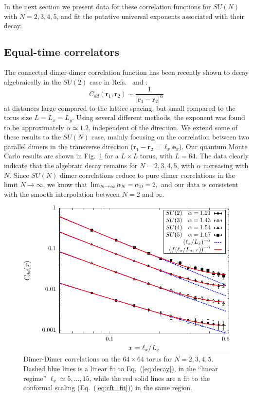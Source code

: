 \documentclass[11pt]{iopart}
\begin{document}
In the next section we present data for these correlation functions for $SU(N)$ with $N=2,3,4,5$,  and fit the putative universal exponents associated with their decay.

\subsection{Equal-time correlators}
\label{sec:dimerdimer}


The connected dimer-dimer correlation function has been recently shown to decay algebraically in the $SU(2)$ case in Refs.~\cite{RVB1} and \cite{RVB2}:
\begin{equation}\label{eq:decay}
 C_{dd}(\mathbf{r}_1,\mathbf{r}_2)\sim \frac{1}{\left|\mathbf{r}_1-\mathbf{r}_2\right|^\alpha}
\end{equation}
at distances large compared to the lattice spacing, but small compared to the torus size $L=L_x=L_y$. Using several different methods, the exponent was found to be approximately $\alpha \simeq 1.2$, independent of the direction.
We extend some of these results to the $SU(N)$ case, mainly focusing on the correlation between two parallel dimers in the transverse direction ($\mathbf{r}_1-\mathbf{r}_2=\ell_x \mathbf{e}_x$). 
Our quantum Monte Carlo results are shown in Fig.~\ref{fig:corr_su2_dimers} for a $L\times L$ torus, with $L=64$. The data clearly indicate that the algebraic decay remains for $N=2,3,4,5$, with $\alpha$ increasing with $N$. 
Since $SU(N)$ dimer correlations reduce to pure dimer correlations in the limit $N\to\infty$, we know that
$
 \lim_{N \to \infty} \alpha_N=\alpha_{\rm D}=2,
$
 and our data is consistent with the smooth interpolation between $N=2$ and $\infty$. \begin{figure}[ht]
 \begin{center}
  \includegraphics[scale=0.8]{./figures/corr_su2.pdf}
 \end{center}
\caption{Dimer-Dimer correlations on the $64 \times 64$ torus for $N=2,3,4,5$. Dashed blue lines is a linear fit to Eq.~(\ref{eq:decay}), in the ``linear regime'' $\ell_x \simeq 5,\ldots,15$, while the red solid lines are a fit to the conformal scaling (Eq.~(\ref{eq:cft_fit})) in the same region.}
\label{fig:corr_su2_dimers}
\end{figure}
\end{document}
